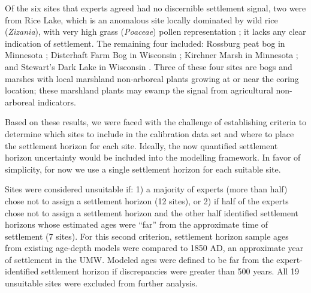 \documentclass[12pt]{article}
\begin{document}

Of the six sites that experts agreed had no discernible settlement
signal, two were from Rice Lake, which is an anomalous site locally
dominated by wild rice (\textit{Zizania}), with very high grass
(\textit{Poaceae}) pollen representation
\citep{mcandrews1969paleobotany}; it lacks any clear indication of
settlement. The remaining four included: Rossburg peat bog in
Minnesota \citep{wright1969}; Disterhaft Farm Bog in Wisconsin
\citep{webb1972late}; Kirchner Marsh in Minnesota
\citep{wright1963two}; and Stewart's Dark Lake in Wisconsin
\citep{peters1979radiocarbon}. Three of these four sites are bogs and
marshes with local marshland non-arboreal plants growing at or near
the coring location; these marshland plants may swamp the signal from
agricultural non-arboreal indicators.

Based on these results, we were faced with the challenge of
establishing criteria to determine which sites to include in the
calibration data set and where to place the settlement horizon for
each site. Ideally, the now quantified settlement horizon uncertainty
would be included into the modelling framework. In favor of
simplicity, for now we use a single settlement horizon for each
suitable site.

Sites were considered unsuitable if: 1) a majority of experts (more
than half) chose not to assign a settlement horizon (12 sites), or 2)
if half of the experts chose not to assign a settlement horizon and
the other half identified settlement horizons whose estimated ages
were “far” from the approximate time of settlement (7 sites). For this
second criterion, settlement horizon sample ages from existing
age-depth models were compared to 1850 AD, an approximate year of
settlement in the UMW. Modeled ages were defined to be far from the
expert-identified settlement horizon if discrepancies were greater
than 500 years. All 19 unsuitable sites were excluded from further
analysis.
\end{document}

